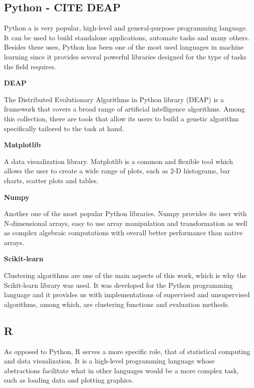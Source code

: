 \subsection{Python - CITE DEAP}

Python a is very popular, high-level and general-purpose programming language. It can be used to build standalone applications, automate tasks and many others. Besides these uses, Python has been one of the most used languages in machine learning since it provides several powerful libraries designed for the type of tasks the field requires.

\textbf{DEAP}

The Distributed Evolutionary Algorithms in Python library (DEAP) is a framework that covers a broad range of artificial intelligence algorithms. Among this collection, there are tools that allow its users to build a genetic algorithm specifically tailored to the task at hand.

\textbf{Matplotlib}

A data visualization library. Matplotlib is a common and flexible tool which allows the user to create a wide range of plots, such as 2-D histograms, bar charts, scatter plots and tables. \cite{Hunter2007}

\medskip
\textbf{Numpy}

Another one of the most popular Python libraries. Numpy provides its user with N-dimensional arrays, easy to use array manipulation and transformation as well as complex algebraic computations with overall better performance than native arrays. \cite{walt2011numpy}

\medskip
\textbf{Scikit-learn}

Clustering algorithms are one of the main aspects of this work, which is why the Scikit-learn \cite{scikitlearn} library was used. It was developed for the Python programming language and it provides us with implementations of supervised and unsupervised algorithms, among which, are clustering functions and evaluation methods.

\subsection{R}

As opposed to Python, R serves a more specific role, that of statistical computing and data visualization. It is a high-level programming language whose abstractions facilitate what in other languages would be a more complex task, such as loading data and plotting graphics.

